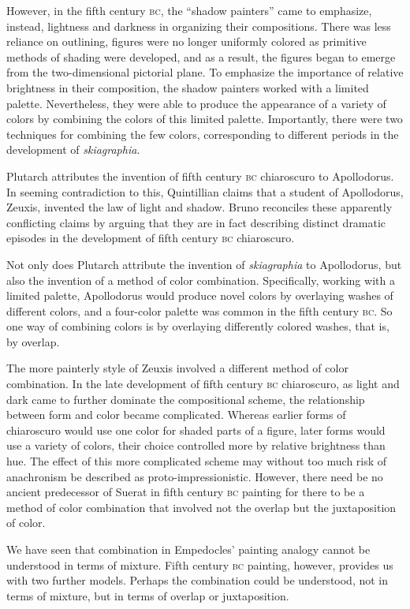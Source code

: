 However, in the fifth century \textsc{bc}, the ``shadow painters'' came to emphasize, instead, lightness and darkness in organizing their compositions. There was less reliance on outlining, figures were no longer uniformly colored as primitive methods of shading were developed, and as a result, the figures began to emerge from the two-dimensional pictorial plane. To emphasize the importance of relative brightness in their composition, the shadow painters worked with a limited palette. Nevertheless, they were able to produce the appearance of a variety of colors by combining the colors of this limited palette. Importantly, there were two techniques for combining the few colors, corresponding to different periods in the development of \emph{skiagraphia}.

Plutarch attributes the invention of fifth century \textsc{bc} chiaroscuro to Apollodorus. In seeming contradiction to this, Quintillian claims that a student of Apollodorus, Zeuxis, invented the law of light and shadow. Bruno reconciles these apparently conflicting claims by arguing that they are in fact describing distinct dramatic episodes in the development of fifth century \textsc{bc} chiaroscuro.

Not only does Plutarch attribute the invention of \emph{skiagraphia} to Apollodorus, but also the invention of a method of color combination. Specifically, working with a limited palette, Apollodorus would produce novel colors by overlaying washes of different colors, and a four-color palette was common in the fifth century \textsc{bc}. So one way of combining colors is by overlaying differently colored washes, that is, by overlap.

The more painterly style of Zeuxis involved a different method of color combination. In the late development of fifth century \textsc{bc} chiaroscuro, as light and dark came to further dominate the compositional scheme, the relationship between form and color became complicated. Whereas earlier forms of chiaroscuro would use one color for shaded parts of a figure, later forms would use a variety of colors, their choice controlled more by relative brightness than hue. The effect of this more complicated scheme may without too much risk of anachronism be described as proto-impressionistic. However, there need be no ancient predecessor of Suerat in fifth century \textsc{bc} painting for there to be a method of color combination that involved not the overlap but the juxtaposition of color.

We have seen that combination in Empedocles' painting analogy cannot be understood in terms of mixture. Fifth century \textsc{bc} painting, however, provides us with two further models. Perhaps the combination could be understood, not in terms of mixture, but in terms of overlap or juxtaposition. 

